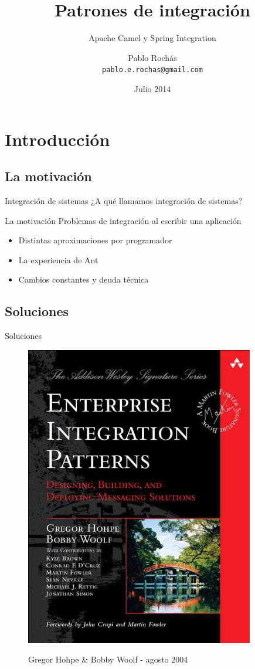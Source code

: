 \documentclass{beamer}
\title{Patrones de integración}
\subtitle{Apache Camel y Spring Integration}
\author[Despegar.com]{Pablo Rochás\\ \texttt{pablo.e.rochas@gmail.com}}
\date[Despegar]{Julio 2014}
\begin{document}
\begin{frame}
\titlepage
\end{frame}

\section{Introducción}
\subsection{La motivación}
\begin{frame}{Integración de sistemas}
¿A qué llamamos integración de sistemas?
\end{frame}

\begin{frame}{La motivación}
Problemas de integración al escribir una aplicación
\begin{itemize}[<+->]
\item Distintas aproximaciones por programador
\item La experiencia de Ant
\item Cambios constantes y deuda técnica
\end{itemize}
\end{frame}

\subsection{Soluciones}
\begin{frame}{Soluciones}
\begin{figure}
\begin{center}
\includegraphics[scale=0.35]{TAPA}

Gregor Hohpe \& Bobby Woolf - agosto 2004
\end{center}
\end{figure}
\end{frame}
\end{document}
